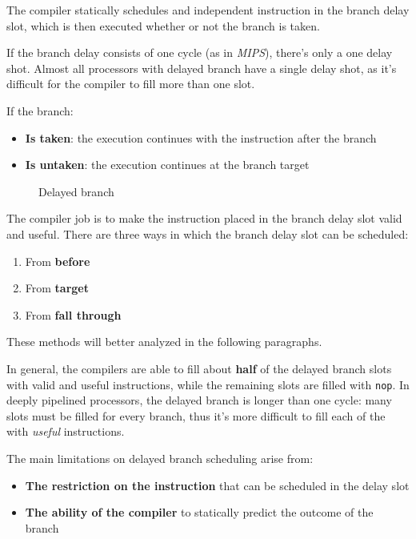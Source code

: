 \documentclass[english]{article}
\begin{document}
The compiler statically schedules and independent instruction in the branch delay slot, which is then executed whether or not the branch is taken.

If the branch delay consists of one cycle (as in \textit{MIPS}), there's only a one delay shot.
Almost all processors with delayed branch have a single delay shot, as it's difficult for the compiler to fill more than one slot.

If the branch:

\begin{itemize}
  \item \textbf{Is taken}: the execution continues with the instruction after the branch
  \item \textbf{Is untaken}: the execution continues at the branch target
\end{itemize}

\begin{figure}[htbp]
  \bigskip
  \centering
  \caption{Delayed branch}
  \label{fig:delayed-branch}
  \bigskip
\end{figure}

The compiler job is to make the instruction placed in the branch delay slot valid and useful.
There are three ways in which the branch delay slot can be scheduled:

\begin{enumerate}
  \item From \textbf{before}
  \item From \textbf{target}
  \item From \textbf{fall through}
\end{enumerate}

These methods will better analyzed in the following paragraphs.

\bigskip
In general, the compilers are able to fill about \textbf{half} of the delayed branch slots with valid and useful instructions, while the remaining slots are filled with \texttt{nop}.
In deeply pipelined processors, the delayed branch is longer than one cycle: many slots must be filled for every branch, thus it's more difficult to fill each of the with \textit{useful} instructions.

\bigskip
The main limitations on delayed branch scheduling arise from:

\begin{itemize}
  \item \textbf{The restriction on the instruction} that can be scheduled in the delay slot
  \item \textbf{The ability of the compiler} to statically predict the outcome of the branch
\end{itemize}
\end{document}

